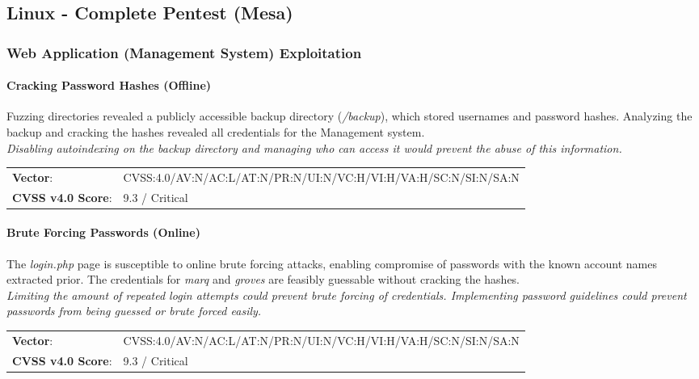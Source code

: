 \documentclass[../report.tex]{subfiles}
\begin{document}
\subsection{Linux - Complete Pentest (Mesa)}

\subsubsection{Web Application (Management System) Exploitation}
\paragraph{Cracking Password Hashes (Offline)}
Fuzzing directories revealed a publicly accessible backup directory (\textit{/backup}), which stored usernames and password hashes.
Analyzing the backup and cracking the hashes revealed all credentials for the Management system.\\
\textit{Disabling autoindexing on the backup directory and managing who can access it would prevent the abuse of this information.}

\begin{tabular}{l l}
\textbf{Vector}: & CVSS:4.0/AV:N/AC:L/AT:N/PR:N/UI:N/VC:H/VI:H/VA:H/SC:N/SI:N/SA:N\\
\textbf{CVSS v4.0 Score}: & 9.3 / Critical\\
\end{tabular}


\paragraph{Brute Forcing Passwords (Online)}
The \textit{login.php} page is susceptible to online brute forcing attacks, enabling compromise of passwords with the known account names extracted prior. The credentials for \textit{marq} and \textit{groves} are feasibly guessable without cracking the hashes.\\
\textit{Limiting the amount of repeated login attempts could prevent brute forcing of credentials. Implementing password guidelines could prevent passwords from being guessed or brute forced easily.}

\begin{tabular}{l l}
\textbf{Vector}: & CVSS:4.0/AV:N/AC:L/AT:N/PR:N/UI:N/VC:H/VI:H/VA:H/SC:N/SI:N/SA:N\\
\textbf{CVSS v4.0 Score}: & 9.3 / Critical\\
\end{tabular}
\end{document}
